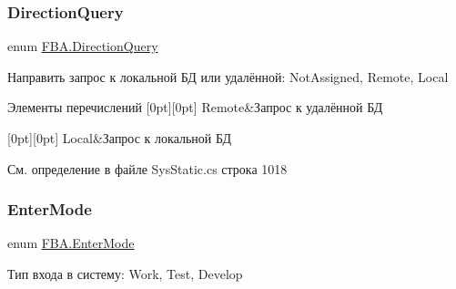 \subsubsection{\texorpdfstring{Direction\+Query}{DirectionQuery}}
{\footnotesize\ttfamily enum \mbox{\hyperlink{namespace_f_b_a_a6ff7d5c242d98046d1980715b06d7300}{F\+B\+A.\+Direction\+Query}}\hspace{0.3cm}{\ttfamily [strong]}}



Направить запрос к локальной БД или удалённой\+: Not\+Assigned, Remote, Local 

\begin{DoxyEnumFields}{Элементы перечислений}
[0pt][0pt]{}\mbox{\label{namespace_f_b_a_a6ff7d5c242d98046d1980715b06d7300af8508f576cd3f742dfc268258dcdf0dd}} 
Remote&Запрос к удалённой БД \\
\hline

[0pt][0pt]{}\mbox{\label{namespace_f_b_a_a6ff7d5c242d98046d1980715b06d7300a509820290d57f333403f490dde7316f4}} 
Local&Запрос к локальной БД \\
\hline

\end{DoxyEnumFields}


См. определение в файле Sys\+Static.\+cs строка 1018

\mbox{\label{namespace_f_b_a_ae06257c0c200c35284fec536bf589744}} 
\subsubsection{\texorpdfstring{Enter\+Mode}{EnterMode}}
{\footnotesize\ttfamily enum \mbox{\hyperlink{namespace_f_b_a_ae06257c0c200c35284fec536bf589744}{F\+B\+A.\+Enter\+Mode}}\hspace{0.3cm}{\ttfamily [strong]}}



Тип входа в систему\+: Work, Test, Develop 

